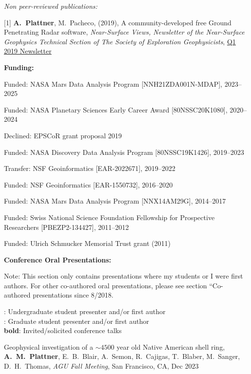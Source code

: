 \documentclass[10pt]{article}
\begin{document}
\spc
\emph{Non peer-reviewed publications:}

\spcp
\hspace{-0.5cm}[1] \textbf{A.~Plattner}, M.~Pacheco, (2019), A
community-developed free Ground Penetrating Radar software,
\emph{Near-Surface Views, Newsletter of the Near-Surface Geophysics
  Technical Section of The Society of Exploration Geophysicists},
\href{https://seg.org/Portals/0/SEG/News%20and%20Resources/Near%20Surface/Near%20Surface%20Newsletter/2011-present/2019_Q1.pdf}{Q1
  2019 Newsletter}


\spc
\textbf{\tsize Funding:}

\spcp
Funded: NASA Mars Data Analysis Program [NNH21ZDA001N-MDAP], 2023--2025

\spcp
Funded: NASA Planetary Sciences Early Career Award [80NSSC20K1080], 2020--2024

\spcp Declined: EPSCoR grant proposal 2019

\spcp
Funded: NASA Discovery Data Analysis Program [80NSSC19K1426], 2019--2023

\spcp
Transfer: NSF Geoinformatics [EAR-2022671], 2019--2022 

\spcp
  Funded: NSF Geoinformatics
  [EAR-1550732],
  2016--2020

 \spcp 
Funded: NASA Mars Data Analysis Program [NNX14AM29G], 2014--2017

\spcp Funded: Swiss National Science Foundation Fellowship for Prospective Researchers
[PBEZP2-134427], 2011--2012

\spcp
Funded: Ulrich Schmucker Memorial Trust grant (2011)


\spc
\textbf{\tsize Conference Oral Presentations:}

\vspace{0.2cm}
Note: This section only contains presentations where my students or I were first authors. For other co-authored oral presentations, please see section ``Co-authored presentations since 8/2018.

\spcp
\ug: Undergraduate student presenter and/or first author\\
\gr: Graduate student presenter and/or first author\\
\textbf{bold}: Invited/solicited conference talks

\spcp
Geophysical investigation of a $\sim4500$ year old Native American shell ring, \textbf{A.~M.~Plattner}, E.~B.~Blair, A.~Semon, R.~Cajigas, T.~Blaber, M.~Sanger, D.~H.~Thomas,  \emph{AGU Fall Meeting}, San Francisco, CA, Dec 2023
\end{document}
